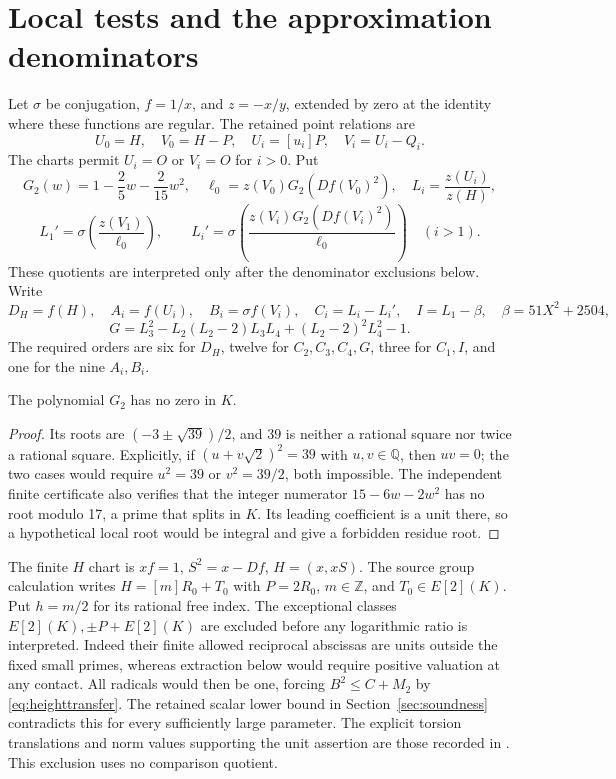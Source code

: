 \documentclass[11pt,a4paper]{article}
\newcommand{\Q}{\mathbb Q}\newcommand{\Z}{\mathbb Z}\newcommand{\HH}{\mathcal H}
\begin{document}
\section{Local tests and the approximation denominators}
Let $\sigma$ be conjugation, $f=1/x$, and $z=-x/y$, extended by zero
at the identity where these functions are regular. The retained
point relations are
\[
 U_0=H,\quad V_0=H-P,\quad U_i=[u_i]P,\quad V_i=U_i-Q_i.
\]
The charts permit $U_i=O$ or $V_i=O$ for $i>0$.
Put
\[
 G_2(w)=1-\frac25w-\frac2{15}w^2,
 \quad \ell_0=z(V_0)G_2(Df(V_0)^2),\quad
 L_i=\frac{z(U_i)}{z(H)},
\]
\[
 L_1'=\sigma\!\left(\frac{z(V_1)}{\ell_0}\right),\qquad
 L_i'=\sigma\!\left(\frac{z(V_i)G_2(Df(V_i)^2)}{\ell_0}\right)\quad(i>1).
\]
These quotients are interpreted only after the denominator exclusions
below. Write
\[
 D_H=f(H),\quad A_i=f(U_i),\quad B_i=\sigma f(V_i),\quad
 C_i=L_i-L_i',\quad I=L_1-\beta,\quad \beta=51X^2+2504,
\]
\[
 G=L_3^2-L_2(L_2-2)L_3L_4+(L_2-2)^2L_4^2-1.
\]
The required orders are six for $D_H$, twelve for $C_2,C_3,C_4,G$,
three for $C_1,I$, and one for the nine $A_i,B_i$.

\begin{lemma}\label{lem:g2}
The polynomial $G_2$ has no zero in $K$.
\end{lemma}
\begin{proof}
Its roots are $(-3\pm\sqrt{39})/2$, and $39$ is neither a rational
square nor twice a rational square. Explicitly, if
$(u+v\sqrt2)^2=39$ with $u,v\in\Q$, then $uv=0$; the two cases
would require $u^2=39$ or $v^2=39/2$, both impossible.
The independent finite certificate also verifies that the integer
numerator $15-6w-2w^2$ has no root modulo 17, a prime that splits in
$K$. Its leading coefficient is a unit there, so a hypothetical local
root would be integral and give a forbidden residue root.
\end{proof}

The finite $H$ chart is $xf=1$, $S^2=x-Df$, $H=(x,xS)$.
The source group calculation writes $H=[m]R_0+T_0$ with $P=2R_0$,
$m\in\Z$, and $T_0\in E[2](K)$. Put $h=m/2$ for its rational
free index. The exceptional classes $E[2](K),\pm P+E[2](K)$ are
excluded before any logarithmic ratio is interpreted. Indeed their
finite allowed reciprocal abscissas are units outside the fixed small
primes, whereas extraction below would require positive valuation
at any contact. All radicals would then be one, forcing
$B^2\le C+M_2$ by \eqref{eq:heighttransfer}. The retained scalar
lower bound in Section~\ref{sec:soundness} contradicts this for every
sufficiently large parameter. The explicit torsion translations and
norm values supporting the unit assertion are those recorded in
\cite[Section 3]{Even}. This exclusion uses no comparison quotient.
\end{document}
